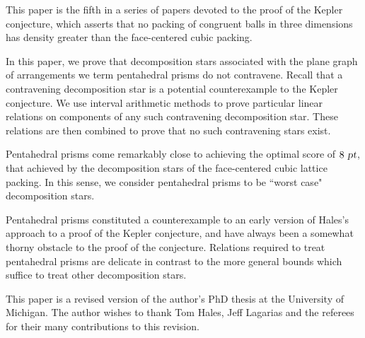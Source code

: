 
This paper is the fifth in a series of papers devoted to the proof
of the Kepler conjecture, which asserts that no packing of congruent
balls in three dimensions has density greater than the face-centered
cubic packing.

In this paper, we prove that decomposition stars associated with the
plane graph of arrangements we term pentahedral prisms do not
contravene.  Recall that a contravening decomposition star is a
potential counterexample to the Kepler conjecture. We use interval
arithmetic methods to prove particular linear relations on
components of any such contravening decomposition star.  These
relations are then combined to prove that no such contravening stars
exist.

Pentahedral prisms come remarkably close to achieving the optimal
score of $8 \text{ \sl pt}$, that achieved by the decomposition stars of
the face-centered cubic lattice packing. In this sense, we consider
pentahedral prisms to be ``worst case" decomposition stars.

Pentahedral prisms constituted a counterexample to an early version
of Hales's approach to a proof of the Kepler conjecture, and have
always been a somewhat thorny obstacle to the proof of the
conjecture. Relations required to treat pentahedral prisms are
delicate in contrast to the more general bounds which suffice  to
treat other decomposition stars.

This paper is a revised version of the author's PhD thesis at the
University of Michigan.  The author wishes to thank Tom Hales, Jeff
Lagarias and the referees for their many contributions to this
revision.
